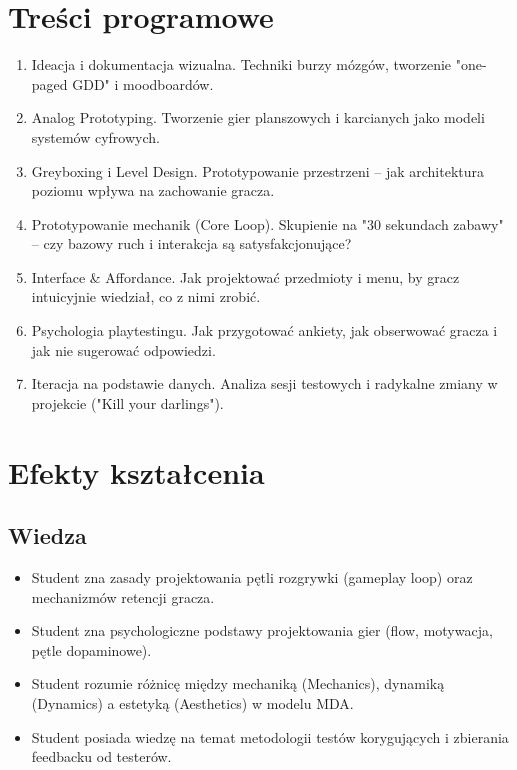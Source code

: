\documentclass[12pt, a4paper]{article}
\begin{document}
\section{Treści programowe}

\begin{enumerate}
  \item Ideacja i dokumentacja wizualna. Techniki burzy mózgów, tworzenie "one-paged GDD" i moodboardów.
  \item Analog Prototyping. Tworzenie gier planszowych i karcianych jako modeli systemów cyfrowych.
  \item Greyboxing i Level Design. Prototypowanie przestrzeni – jak architektura poziomu wpływa na zachowanie gracza.
  \item Prototypowanie mechanik (Core Loop). Skupienie na "30 sekundach zabawy" – czy bazowy ruch i interakcja są satysfakcjonujące?
  \item Interface \& Affordance. Jak projektować przedmioty i menu, by gracz intuicyjnie wiedział, co z nimi zrobić.
  \item Psychologia playtestingu. Jak przygotować ankiety, jak obserwować gracza i jak nie sugerować odpowiedzi.
  \item Iteracja na podstawie danych. Analiza sesji testowych i radykalne zmiany w projekcie ("Kill your darlings").
\end{enumerate}

\section{Efekty kształcenia}

\subsection*{Wiedza}
\begin{itemize}
  \item Student zna zasady projektowania pętli rozgrywki (gameplay loop) oraz mechanizmów retencji gracza.
  \item Student zna psychologiczne podstawy projektowania gier (flow, motywacja, pętle dopaminowe).
  \item Student rozumie różnicę między mechaniką (Mechanics), dynamiką (Dynamics) a estetyką (Aesthetics) w modelu MDA.
  \item Student posiada wiedzę na temat metodologii testów korygujących i zbierania feedbacku od testerów.
\end{itemize}
\end{document}
